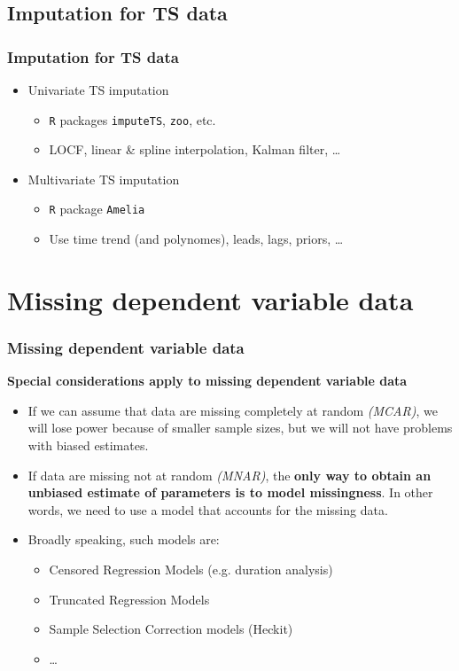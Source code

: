\documentclass{beamer}
\begin{document}
\subsection{Imputation for TS data}
\begin{frame}
\frametitle{Imputation for TS data}
\begin{itemize}
    \item Univariate TS imputation
    \medskip
        \begin{itemize}
        \item \texttt{R} packages \texttt{imputeTS}, \texttt{zoo}, etc.
        \medskip
        \item LOCF, linear \& spline interpolation, Kalman filter, \dots
    \end{itemize}
    \bigskip
    \item Multivariate TS imputation
    \medskip
    \begin{itemize}
        \item \texttt{R} package \texttt{Amelia}
        \medskip
        \item Use time trend (and polynomes), leads, lags, priors, \dots
    \end{itemize}
\end{itemize}

 \end{frame}

\section{Missing dependent variable data}
\begin{frame}
\frametitle{Missing dependent variable data}

\textbf{Special considerations apply to missing dependent variable data}

\begin{itemize}
  \item If we can assume that data are missing completely at random \textit{(MCAR)}, we will lose power because of smaller sample sizes, but we will not have problems with biased estimates.
  \item If data are missing not at random \textit{(MNAR)}, the \textbf{only way to obtain an unbiased estimate of parameters is to model missingness}. In other words, we need to use a model that accounts for the missing data.
  \item Broadly speaking, such models are:
  \begin{itemize}
    \item Censored Regression Models (e.g. duration analysis) 
    \item Truncated Regression Models 
    \item Sample Selection Correction models (Heckit)
    \item \dots
  \end{itemize}
\end{itemize}

\end{frame}
\end{document}
